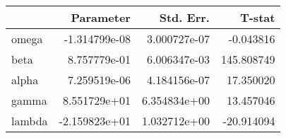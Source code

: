 \begin{tabular}{lrrr}
\toprule
{} &     Parameter &     Std. Err. &      T-stat \\
\midrule
omega  & -1.314799e-08 &  3.000727e-07 &   -0.043816 \\
beta   &  8.757779e-01 &  6.006347e-03 &  145.808749 \\
alpha  &  7.259519e-06 &  4.184156e-07 &   17.350020 \\
gamma  &  8.551729e+01 &  6.354834e+00 &   13.457046 \\
lambda & -2.159823e+01 &  1.032712e+00 &  -20.914094 \\
\bottomrule
\end{tabular}
